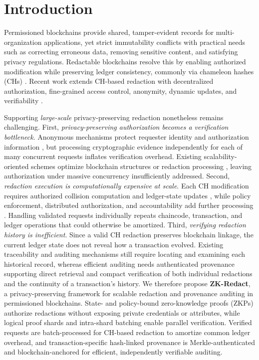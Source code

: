 \documentclass[lettersize,journal]{IEEEtran}
\begin{document}
\section{Introduction}

Permissioned blockchains provide shared, tamper-evident records for
multi-organization applications, yet strict immutability conflicts with
practical needs such as correcting erroneous data, removing sensitive
content, and satisfying privacy regulations. Redactable blockchains
resolve this by enabling authorized modification while preserving ledger
consistency, commonly via chameleon hashes (CHs) \cite{ref1,ref2,ref9}.
Recent work extends CH-based redaction with decentralized authorization,
fine-grained access control, anonymity, dynamic updates, and
verifiability \cite{ref4,ref6,ref14,ref15,ref16,ref20}.

Supporting \emph{large-scale} privacy-preserving redaction nonetheless
remains challenging. First, \emph{privacy-preserving authorization
becomes a verification bottleneck}. Anonymous mechanisms protect
requester identity and authorization information
\cite{ref4,ref14,ref17}, but processing cryptographic evidence
independently for each of many concurrent requests inflates verification
overhead. Existing scalability-oriented schemes optimize blockchain
structures or redaction processing \cite{ref10,ref14,ref21}, leaving
authorization under massive concurrency insufficiently addressed.
Second, \emph{redaction execution is computationally expensive at
scale}. Each CH modification requires authorized collision computation
and ledger-state updates \cite{ref1,ref2,ref6,ref19}, while policy
enforcement, distributed authorization, and accountability add further
processing \cite{ref15,ref20}. Handling validated requests
individually repeats chaincode, transaction, and ledger operations that
could otherwise be amortized.
Third, \emph{verifying redaction history is inefficient}. Since a valid
CH redaction preserves blockchain linkage, the current ledger state does
not reveal how a transaction evolved. Existing traceability and
auditing mechanisms \cite{ref10,ref13,ref16,ref20} still require
locating and examining each historical record, whereas efficient
auditing needs authenticated provenance supporting direct retrieval and
compact verification of both individual redactions and the continuity of
a transaction's history.
We therefore propose \textbf{ZK-Redact}, a privacy-preserving framework
for scalable redaction and provenance auditing in permissioned
blockchains. State- and policy-bound zero-knowledge proofs (ZKPs)
authorize redactions without exposing private credentials or attributes,
while logical proof shards and intra-shard batching enable parallel
verification. Verified requests are batch-processed for CH-based
redaction to amortize common ledger overhead, and transaction-specific
hash-linked provenance is Merkle-authenticated and blockchain-anchored
for efficient, independently verifiable auditing.
\end{document}
